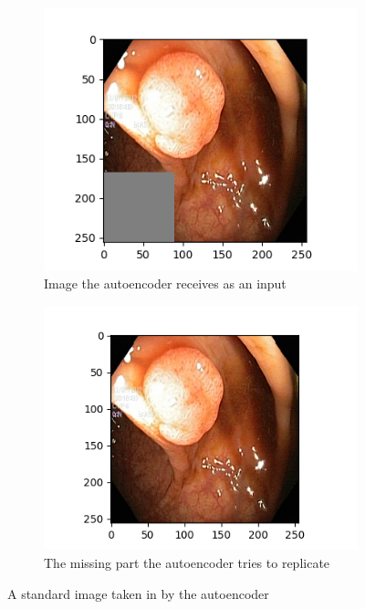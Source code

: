 \begin{figure}[]
\centering
\begin{subfigure}[b]{0.45\textwidth}
    \centering
    \includegraphics[width=\textwidth]{methodology/figures/masked_img.png}
    \caption{Image the autoencoder receives as an input }    
    \label{fig:AErec}
\end{subfigure}
\hfill
\begin{subfigure}[b]{0.49\textwidth}  
    \centering 
    \includegraphics[width=\textwidth]{methodology/figures/whole_img.png}
    \caption[Hate to be this guy]%
    {{\small The missing part the autoencoder tries to replicate}}    
    \label{fig:AErep}
\end{subfigure}
\caption{A standard image taken in by the autoencoder} 
\label{fig:AEmasks}
\end{figure}

